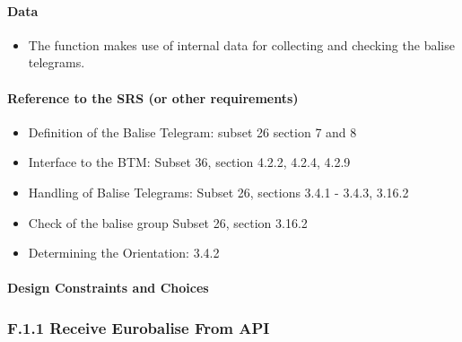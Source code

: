 \documentclass{template/openetcs_report}
\begin{document}
\paragraph{Data}
\begin{itemize}
\item The function makes use of internal data for collecting and checking the balise telegrams. 
\end{itemize}

\paragraph{Reference to the SRS (or other requirements)}
\begin{itemize}
\item Definition of the Balise Telegram: subset 26 section 7 and 8\\
\item Interface to the BTM: Subset 36, section  4.2.2, 4.2.4, 4.2.9\\
\item Handling of Balise Telegrams: Subset 26, sections 3.4.1 - 3.4.3, 3.16.2 \\
\item Check of the balise group Subset 26, section 3.16.2\\
\item Determining the Orientation: 3.4.2\\
\end{itemize}

\paragraph{Design Constraints and Choices}


\subsubsection{F.1.1 Receive Eurobalise From API}\label{ss:ReceiveEurobaliseFromAPI}
\end{document}
